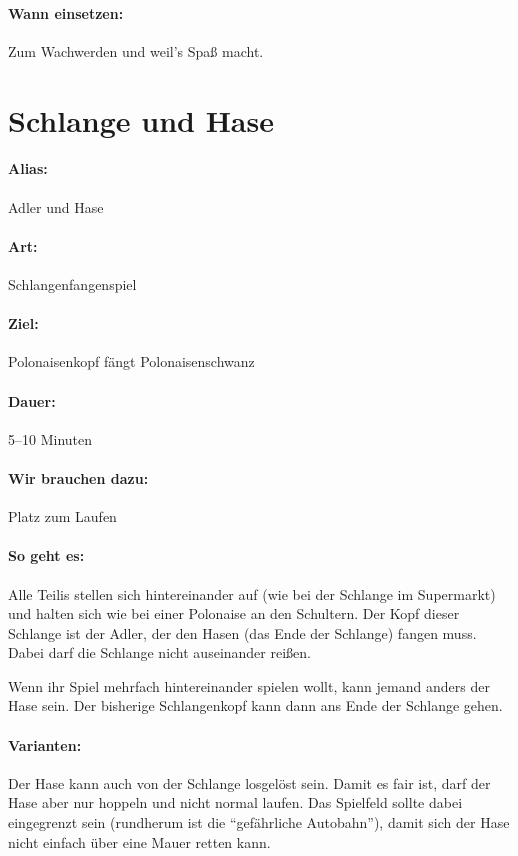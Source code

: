 \paragraph{Wann einsetzen:} Zum Wachwerden und weil's Spaß macht.

\section{Schlange und Hase}
\paragraph{Alias:} Adler und Hase
\paragraph{Art:} Schlangenfangenspiel
\paragraph{Ziel:} Polonaisenkopf fängt Polonaisenschwanz
\paragraph{Dauer:} 5--10 Minuten
\paragraph{Wir brauchen dazu:} Platz zum Laufen
\paragraph{So geht es:} Alle Teilis stellen sich hintereinander auf (wie bei der Schlange im Supermarkt) und halten sich wie bei einer Polonaise an den Schultern. Der Kopf dieser Schlange ist der Adler, der den Hasen (das Ende der Schlange) fangen muss. Dabei darf die Schlange nicht auseinander reißen.

Wenn ihr Spiel mehrfach hintereinander spielen wollt, kann jemand anders der Hase sein. Der bisherige Schlangenkopf kann dann ans Ende der Schlange gehen.
\paragraph{Varianten:} Der Hase kann auch von der Schlange losgelöst sein. Damit es fair ist, darf der Hase aber nur hoppeln und nicht normal laufen. Das Spielfeld sollte dabei eingegrenzt sein (rundherum ist die "`gefährliche Autobahn"'), damit sich der Hase nicht einfach über eine Mauer retten kann.
